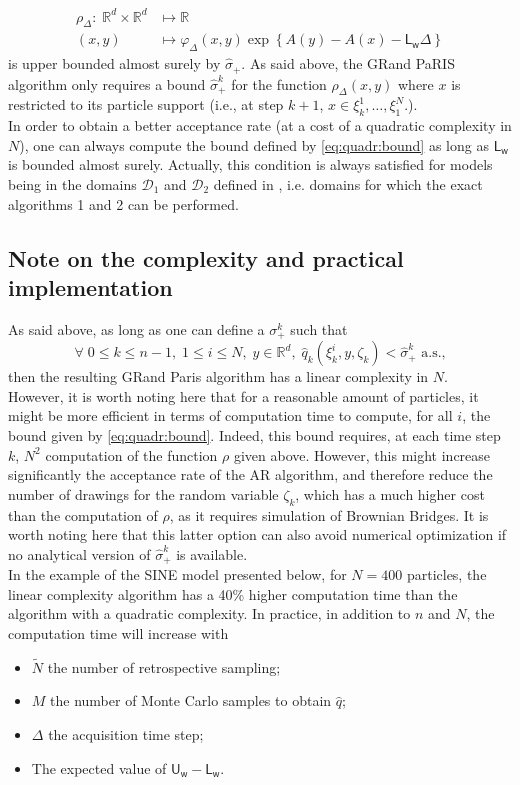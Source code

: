 \documentclass[12pt,draft]{article}
\newcommand{\eqsp}{\;}
\newcommand{\1}{\mathrm{1}}
\newcommand{\mw}{\mathsf{w}}%
\newcommand{\U}{\mathsf{U}}
\newcommand{\Lo}{\mathsf{L}}
\begin{document}
\begin{align*}
\rho_\Delta:\eqsp\mathbb{R}^d\times \mathbb{R}^d &\mapsto \mathbb{R}\\
(x,y)&\mapsto \varphi_\Delta(x,y) \exp \left\{A(y) - A(x)- \Lo_\mw\Delta \right\}
\end{align*}
is upper bounded almost surely by $\hat{\sigma}_+$.
As said above, the GRand PaRIS algorithm only requires a bound $\hat{\sigma}_+^k$ for the function $\rho_\Delta(x,y)$ where $x$ is restricted to its particle support (i.e., at step $k+1$, $x \in \xi_{k}^1,\dots,\xi_{1}^N$.).\\ 
In order to obtain a better acceptance rate (at a cost of a quadratic complexity in $N$), one can always compute the bound defined by \eqref{eq:quadr:bound} as long as $\Lo_\mw$ is bounded almost surely. Actually, this condition is always satisfied for models being in the domains $\mathcal{D}_1$ and $\mathcal{D}_2$ defined in \cite{beskos:papaspiliopoulos:roberts:fearnhead:2006}, i.e. domains for which the exact algorithms 1 and 2 can be performed.
\subsection*{Note on the complexity and practical implementation}

As said above, as long as one can define a $\sigma_+^k$ such that
$$ \forall\eqsp 0\leq k\leq n-1,\eqsp 1\leq i\leq N,\eqsp y\in\mathbb{R}^d,\eqsp \hat{q}_k(\xi_k^i,y,\zeta_k)<\hat{\sigma}_+^k \text{ a.s.,}$$ then the resulting GRand Paris algorithm has a linear complexity in $N$.\\
However, it is worth noting here that for a reasonable amount of particles, it might be more efficient in terms of computation time to compute, for all $i$, the bound given by \eqref{eq:quadr:bound}. Indeed, this bound requires, at each time step $k$, $N^2$ computation of the function $\rho$ given above. However, this might increase significantly the acceptance rate of the AR algorithm, and therefore reduce the number of drawings for the random variable $\zeta_k$, which has a much higher cost than the computation of $\rho$, as it requires simulation of Brownian Bridges. It is worth noting here that this latter option can also avoid numerical optimization if no analytical version of $\hat{\sigma}_+^k$ is available.\\
In the example of the SINE model presented below, for $N=400$ particles, the linear complexity algorithm has a 40\% higher computation time than the algorithm with a quadratic complexity. In practice, in addition to $n$ and $N$, the computation time will increase with
\begin{itemize}
\item $\tilde{N}$ the number of retrospective sampling;
\item $M$ the number of Monte Carlo samples to obtain $\hat{q}$;
\item $\Delta$ the acquisition time step;
\item The expected value of $\U_\mw-\Lo_\mw$.
\end{itemize}
\end{document}
